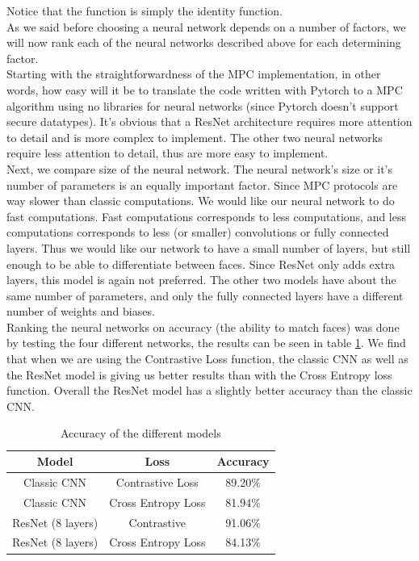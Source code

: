Notice that the  function is simply the identity function.\\

As we said before choosing a neural network depends on a number of factors, we will now rank each of the neural networks described above for each determining factor.\\

Starting with the straightforwardness of the MPC implementation, in other words, how easy will it be to translate the code written with Pytorch to a MPC algorithm using no libraries for neural networks (since Pytorch doesn't support secure datatypes). It's obvious that a ResNet architecture requires more attention to detail and is more complex to implement. The other two neural networks require less attention to detail, thus are more easy to implement.\\

Next, we compare size of the neural network. The neural network's size or it's number of parameters is an equally important factor. Since MPC protocols are way slower than classic computations. We would like our neural network to do fast computations. Fast computations corresponds to less computations, and less computations corresponds to less (or smaller) convolutions or fully connected layers. Thus we would like our network to have a small number of layers, but still enough to be able to differentiate between faces. Since ResNet only adds extra layers, this model is again not preferred. The other two models have about the same number of parameters, and only the fully connected layers have a different number of weights and biases.\\

Ranking the neural networks on accuracy (the ability to match faces) was done by testing the four different networks, the results can be seen in table \ref{table:designaccuracy}. We find that when we are using the Contrastive Loss function, the classic CNN as well as the ResNet model is giving us better results than with the Cross Entropy loss function. Overall the ResNet model has a slightly better accuracy than the classic CNN.


\begin{table}[H]
\centering
\begin{tabular}{||c c c||}
 \hline
 Model & Loss & Accuracy \\ [0.5ex]
 \hline\hline
 Classic CNN  & Contrastive Loss & 89.20\% \\
 Classic CNN  & Cross Entropy Loss & 81.94\% \\
 ResNet (8 layers)  & Contrastive & 91.06\% \\
 ResNet (8 layers)  & Cross Entropy Loss & 84.13\% \\
 \hline
\end{tabular}
\caption{Accuracy of the different models}
\label{table:designaccuracy}
\end{table}

